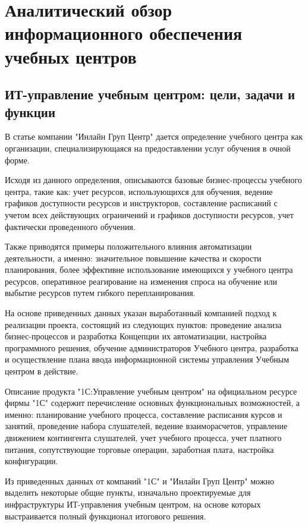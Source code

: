 \section{Аналитический обзор информационного обеспечения учебных центров}


\subsection{ИТ-управление учебным центром: цели, задачи и функции}

В статье компании "Инлайн Груп Центр" \cite{inlinegroup-c} дается определение учебного центра как организации, специализирующаяся на предоставлении услуг обучения в очной форме.

Исходя из данного определения, описываются базовые бизнес-процессы учебного центра, такие как: учет ресурсов, использующихся для обучения, ведение графиков доступности ресурсов и инструкторов, составление расписаний с учетом всех действующих ограничений и графиков доступности ресурсов, учет фактически проведенного обучения.

Также приводятся примеры положительного влияния автоматизации деятельности, а именно: значительное повышение качества и скорости планирования, более эффективне использование имеющихся у учебного центра ресурсов, оперативное реагирование на изменения спроса на обучение или выбытие ресурсов путем гибкого перепланирования.

На основе приведенных данных указан выработанный компанией подход к реализации проекта, состоящий из следующих пунктов: проведение анализа бизнес-процессов и разработка Концепции их автоматизации, настройка программного решения, обучение администраторов Учебного центра, разработка и осуществление плана ввода информационной системы управления Учебным центром в действие.

Описание продукта "1С:Управление учебным центром" на официальном ресурсе фирмы "1С" \cite{1c-training-center} содержит перечисление основных функциональных возможностей, а именно: планирование учебного процесса, составление расписания курсов и занятий, проведение набора слушателей, ведение взаиморасчетов, управление движением контингента слушателей, учет учебного процесса, учет платного питания, сопутствующие торговые операции, заработная плата, настройка конфигурации.

Из приведенных данных от компаний "1С" и "Инлайн Груп Центр" можно выделить некоторые общие пункты, изначально проектируемые для инфраструктуры ИТ-управления учебным центром, на основе которых выстраивается полный функционал итогового решения.


